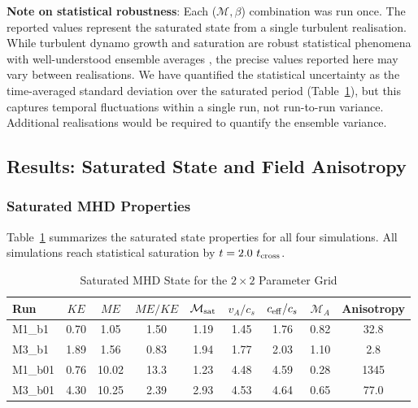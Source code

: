 \documentclass[11pt,a4paper]{article}
\begin{document}
\noindent\textbf{Note on statistical robustness}: Each ($\mathcal{M},\text{$\beta$}$) combination was run once. The reported values represent the saturated state from a single turbulent realisation. While turbulent dynamo growth and saturation are robust statistical phenomena with well-understood ensemble averages \citep[e.g.,][]{Federrath2011}, the precise values reported here may vary between realisations. We have quantified the statistical uncertainty as the time-averaged standard deviation over the saturated period (Table~\ref{tab:mhd_saturated}), but this captures temporal fluctuations within a single run, not run-to-run variance. Additional realisations would be required to quantify the ensemble variance.

\subsection{Results: Saturated State and Field Anisotropy}

\subsubsection{Saturated MHD Properties}

Table~\ref{tab:mhd_saturated} summarizes the saturated state properties for all four simulations. All simulations reach statistical saturation by $t = 2.0~t_{\rm cross}$.

\begin{table}[H]
\centering
\caption{Saturated MHD State for the $2\times2$ Parameter Grid}
\label{tab:mhd_saturated}
\begin{tabular}{lcccccccc}
\toprule
Run & $KE$ & $ME$ & $ME/KE$ & $\mathcal{M}_{\rm sat}$ & $v_A/c_s$ & $c_{\rm eff}/c_s$ & $\mathcal{M}_A$ & Anisotropy \\
\midrule
M1\_b1  & 0.70 & 1.05 & 1.50 & 1.19 & 1.45 & 1.76 & 0.82 & 32.8 \\
M3\_b1  & 1.89 & 1.56 & 0.83 & 1.94 & 1.77 & 2.03 & 1.10 & 2.8 \\
M1\_b01 & 0.76 & 10.02 & 13.3 & 1.23 & 4.48 & 4.59 & 0.28 & 1345 \\
M3\_b01 & 4.30 & 10.25 & 2.39 & 2.93 & 4.53 & 4.64 & 0.65 & 77.0 \\
\bottomrule
\end{tabular}
\end{table}
\end{document}
